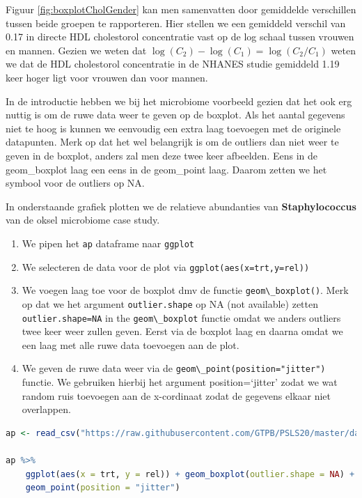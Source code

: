 \documentclass[
  12pt,dutch,coursenotes]{book}
\newcommand{\passthrough}[1]{#1}
\providecommand{\tightlist}{%
  \setlength{\itemsep}{0pt}\setlength{\parskip}{0pt}}
\theoremstyle{definition}
\theoremstyle{definition}
\theoremstyle{definition}
\theoremstyle{definition}
\theoremstyle{remark}
\begin{document}
Figuur \ref{fig:boxplotCholGender} kan men samenvatten door gemiddelde verschillen tussen beide groepen te rapporteren. Hier stellen we een gemiddeld verschil van 0.17 in directe HDL cholestorol concentratie vast op de log schaal tussen vrouwen en mannen.
Gezien we weten dat \(\log(C_2)-\log(C_1)=\log(C_2/C_1)\) weten we dat de HDL cholestorol concentratie in de NHANES studie gemiddeld 1.19 keer hoger ligt voor vrouwen dan voor mannen.

In de introductie hebben we bij het microbiome voorbeeld gezien dat het ook erg nuttig is om de ruwe data weer te geven op de boxplot. Als het aantal gegevens niet te hoog is kunnen we eenvoudig een extra laag toevoegen met de originele datapunten. Merk op dat het wel belangrijk is om de outliers dan niet weer te geven in de boxplot, anders zal men deze twee keer afbeelden. Eens in de geom\_boxplot laag een eens in de geom\_point laag. Daarom zetten we het symbool voor de outliers op NA.

In onderstaande grafiek plotten we de relatieve abundanties van \textbf{Staphylococcus} van de oksel microbiome case study.

\begin{enumerate}
\def\labelenumi{\arabic{enumi}.}
\tightlist
\item
  We pipen het \passthrough{\lstinline!ap!} dataframe naar \passthrough{\lstinline!ggplot!}
\item
  We selecteren de data voor de plot via \passthrough{\lstinline!ggplot(aes(x=trt,y=rel))!}
\item
  We voegen laag toe voor de boxplot dmv de functie \passthrough{\lstinline!geom\_boxplot()!}. Merk op dat we het argument \passthrough{\lstinline!outlier.shape!} op NA (not available) zetten \passthrough{\lstinline!outlier.shape=NA!} in the \passthrough{\lstinline!geom\_boxplot!} functie omdat we anders outliers twee keer weer zullen geven. Eerst via de boxplot laag en daarna omdat we een laag met alle ruwe data toevoegen aan de plot.
\item
  We geven de ruwe data weer via de \passthrough{\lstinline!geom\_point(position="jitter")!} functie. We gebruiken hierbij het argument position=`jitter' zodat we wat random ruis toevoegen aan de x-cordinaat zodat de gegevens elkaar niet overlappen.
\end{enumerate}

\begin{lstlisting}[language=R]
ap <- read_csv("https://raw.githubusercontent.com/GTPB/PSLS20/master/data/armpit.csv")

ap %>%
    ggplot(aes(x = trt, y = rel)) + geom_boxplot(outlier.shape = NA) +
    geom_point(position = "jitter")
\end{lstlisting}
\end{document}
